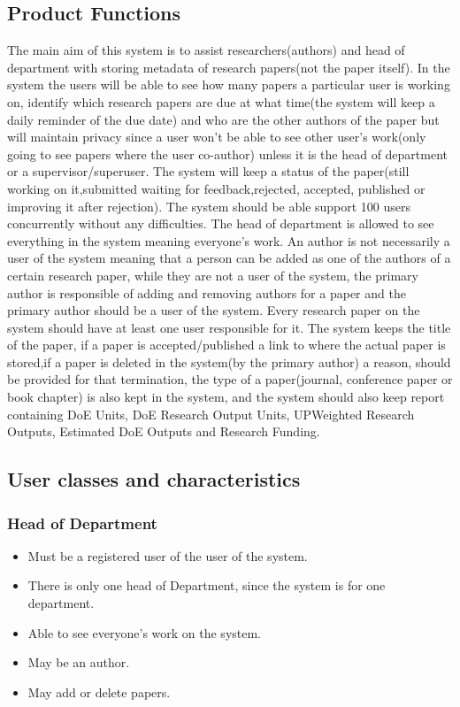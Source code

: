 \documentclass[a4paper,12pt]{report}
\begin{document}
\subsection{Product Functions}
The main aim of this system is to assist researchers(authors) and head of department with storing metadata of research papers(not the paper itself). In the system the users will be able to see how many papers a particular user is working on, identify which research papers are due at what time(the system will keep a daily reminder of the due date) and who are the other authors of the paper but will maintain privacy since a user won't be able to see other user's work(only going to see papers where the user co-author) unless it is the head of department or a supervisor/superuser. The system will keep a status of the paper(still working on it,submitted waiting for feedback,rejected, accepted, published or improving it after rejection).
\newline The system should be able support 100 users concurrently without any difficulties. The head of department is allowed to see everything in the system meaning everyone's work. An author is not necessarily a user of the system meaning that a person can be added as one of the authors of a certain research paper, while they are not a user of the system, the primary author is responsible of adding and removing authors for a paper and the primary author should be a user of the system.
\newline Every research paper on the system should have at least one user responsible for it. The system keeps the title of the paper, if a paper is accepted/published a link to where the actual paper is stored,if a paper is deleted in the system(by the primary author) a reason, should be provided for that termination, the type of a paper(journal, conference paper or book chapter) is also kept in the system, and the system should also keep report containing DoE Units, DoE Research Output Units, UPWeighted Research Outputs, Estimated DoE Outputs and Research Funding.

\subsection{User classes and characteristics}
\subsubsection{Head of Department}
	\begin{itemize}
		\item Must be a registered user of the user of the system.
		\item There is only one head of Department, since the system is for one department.
		\item Able to see everyone's work on the system.
		\item May be an author.
		\item May add or delete papers.
	\end{itemize}
\end{document}
